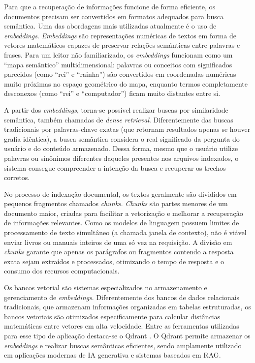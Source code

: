 \documentclass[12pt, openright, oneside, a4paper, brazil]{ads-unipac-abntex2}
\begin{document}
Para que a recuperação de informações funcione de forma eficiente, os documentos precisam ser convertidos em formatos adequados para busca semântica. Uma das abordagens mais utilizadas atualmente é o uso de \textit{embeddings}. \textit{Embeddings} são representações numéricas de textos em forma de vetores matemáticos capazes de preservar relações semânticas entre palavras e frases. Para um leitor não familiarizado, os \textit{embeddings} funcionam como um ``mapa semântico'' multidimensional: palavras ou conceitos com significados parecidos (como ``rei'' e ``rainha'') são convertidos em coordenadas numéricas muito próximas no espaço geométrico do mapa, enquanto termos completamente desconexos (como ``rei'' e ``computador'') ficam muito distantes entre si.

A partir dos \textit{embeddings}, torna-se possível realizar buscas por similaridade semântica, também chamadas de \textit{dense retrieval}. Diferentemente das buscas tradicionais por palavras-chave exatas (que retornam resultados apenas se houver grafia idêntica), a busca semântica considera o real significado da pergunta do usuário e do conteúdo armazenado. Dessa forma, mesmo que o usuário utilize palavras ou sinônimos diferentes daqueles presentes nos arquivos indexados, o sistema consegue compreender a intenção da busca e recuperar os trechos corretos.

No processo de indexação documental, os textos geralmente são divididos em pequenos fragmentos chamados \textit{chunks}. \textit{Chunks} são partes menores de um documento maior, criadas para facilitar a vetorização e melhorar a recuperação de informações relevantes. Como os modelos de linguagem possuem limites de processamento de texto simultâneo (a chamada janela de contexto), não é viável enviar livros ou manuais inteiros de uma só vez na requisição. A divisão em \textit{chunks} garante que apenas os parágrafos ou fragmentos contendo a resposta exata sejam extraídos e processados, otimizando o tempo de resposta e o consumo dos recursos computacionais.

Os bancos vetorial são sistemas especializados no armazenamento e gerenciamento de \textit{embeddings}. Diferentemente dos bancos de dados relacionais tradicionais, que armazenam informações organizadas em tabelas estruturadas, os bancos vetoriais são otimizados especificamente para calcular distâncias matemáticas entre vetores em alta velocidade. Entre as ferramentas utilizadas para esse tipo de aplicação destaca-se o Qdrant \cite{qdrant2020}. O Qdrant permite armazenar os \textit{embeddings} e realizar buscas semânticas eficientes, sendo amplamente utilizado em aplicações modernas de IA generativa e sistemas baseados em RAG.
\end{document}
